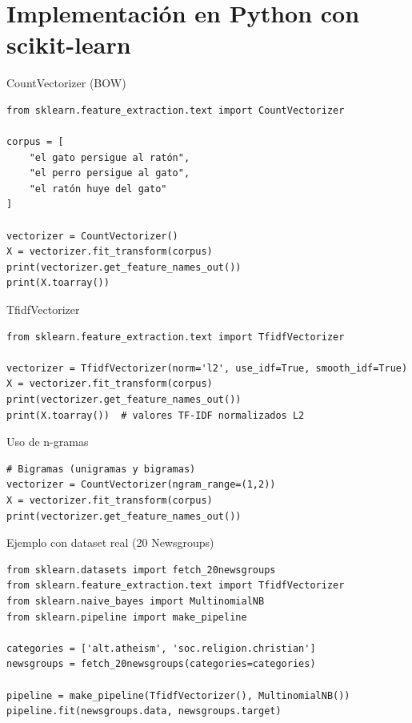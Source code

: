 \documentclass[aspectratio=169, 10pt, xcolor=table]{beamer}
\begin{document}
\section{Implementación en Python con scikit-learn}

\begin{frame}[fragile]{CountVectorizer (BOW)}
    \begin{lstlisting}
from sklearn.feature_extraction.text import CountVectorizer

corpus = [
    "el gato persigue al ratón",
    "el perro persigue al gato",
    "el ratón huye del gato"
]

vectorizer = CountVectorizer()
X = vectorizer.fit_transform(corpus)
print(vectorizer.get_feature_names_out())
print(X.toarray())
    \end{lstlisting}
\end{frame}

\begin{frame}[fragile]{TfidfVectorizer}
    \begin{lstlisting}
from sklearn.feature_extraction.text import TfidfVectorizer

vectorizer = TfidfVectorizer(norm='l2', use_idf=True, smooth_idf=True)
X = vectorizer.fit_transform(corpus)
print(vectorizer.get_feature_names_out())
print(X.toarray())  # valores TF-IDF normalizados L2
    \end{lstlisting}
\end{frame}

\begin{frame}[fragile]{Uso de n-gramas}
    \begin{lstlisting}
# Bigramas (unigramas y bigramas)
vectorizer = CountVectorizer(ngram_range=(1,2))
X = vectorizer.fit_transform(corpus)
print(vectorizer.get_feature_names_out())
    \end{lstlisting}
\end{frame}

\begin{frame}[fragile]{Ejemplo con dataset real (20 Newsgroups)}
    \begin{lstlisting}
from sklearn.datasets import fetch_20newsgroups
from sklearn.feature_extraction.text import TfidfVectorizer
from sklearn.naive_bayes import MultinomialNB
from sklearn.pipeline import make_pipeline

categories = ['alt.atheism', 'soc.religion.christian']
newsgroups = fetch_20newsgroups(categories=categories)

pipeline = make_pipeline(TfidfVectorizer(), MultinomialNB())
pipeline.fit(newsgroups.data, newsgroups.target)
    \end{lstlisting}
\end{frame}
\end{document}
